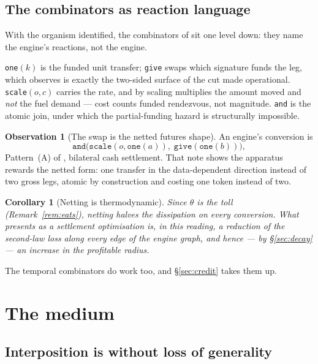 \documentclass[11pt]{article}
\theoremstyle{plain}
\newtheorem{corollary}[theorem]{Corollary}
\theoremstyle{definition}
\newtheorem{observation}[theorem]{Observation}
\theoremstyle{remark}
\begin{document}
\subsection{The combinators as reaction language}

With the organism identified, the combinators of \cite{SPJ2000} sit one
level down: they name the engine's reactions, not the engine.

\texttt{one}$(k)$ is the funded unit transfer; \texttt{give} swaps which
signature funds the leg, which \cite[\S3.1]{finrho} observes is exactly the
two-sided surface of the cut made operational. \texttt{scale}$(o,c)$
carries the rate, and by \cite[\S3.6]{finrho} scaling multiplies the amount
moved and \emph{not} the fuel demand --- cost counts funded rendezvous, not
magnitude. \texttt{and} is the atomic join, under which the partial-funding
hazard is structurally impossible.

\begin{observation}[The swap is the netted futures shape]
An engine's conversion is
\[
  \texttt{and}\bigl(\texttt{scale}(o,\texttt{one}(a)),\;
                    \texttt{give}(\texttt{one}(b))\bigr),
\]
Pattern~(A) of \cite[Tab.~1]{finrho}, bilateral cash settlement. That
note shows the apparatus rewards the netted form: one transfer in the
data-dependent direction instead of two gross legs, atomic by construction
and costing one token instead of two.
\end{observation}

\begin{corollary}[Netting is thermodynamic]
Since $\theta$ is the toll (Remark~\ref{rem:eats}), netting halves the
dissipation on every conversion. What \cite{finrho} presents as a
settlement optimisation is, in this reading, a reduction of the second-law
loss along every edge of the engine graph, and hence --- by
\S\ref{sec:decay} --- an increase in the profitable radius.
\end{corollary}

The temporal combinators do work too, and \S\ref{sec:credit} takes them up.

\section{The medium}
\label{sec:medium}

\subsection{Interposition is without loss of generality}
\end{document}
